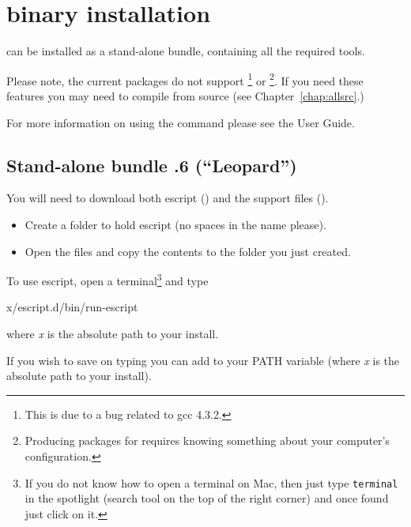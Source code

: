 %
%
%

\section{\macosx binary installation}
\label{sec:binmac}

\esfinley can be installed as a stand-alone bundle, containing all the required tools.

Please note, the current packages do not support \openmp\footnote{This is due to a bug related to gcc 4.3.2.} or \mpi\footnote{Producing packages for \mpi requires knowing something about your computer's configuration.}.
If you need these features you may need to compile \esfinley from source (see Chapter~\ref{chap:allsrc}.)

For more information on using the  command please see the User Guide.

\subsection{Stand-alone bundle .6 (``Leopard'')}

You will need to download both escript () and the support files ().
\begin{itemize}
\item Create a folder to hold escript (no spaces in the name please).
\item Open the  files and copy the contents to the folder you just created.
\end{itemize}

To use escript, open a terminal\footnote{If you do not know how to open a terminal on Mac, then just type \texttt{terminal} in the spotlight (search tool on the top of the right corner) and once found just click on it.} and type
\begin{shellCode}
x/escript.d/bin/run-escript
\end{shellCode}
where \textit{x} is the absolute path to your install.

If you wish to save on typing you can add  to your PATH variable (where \textit{x} is the absolute path to your install). 

